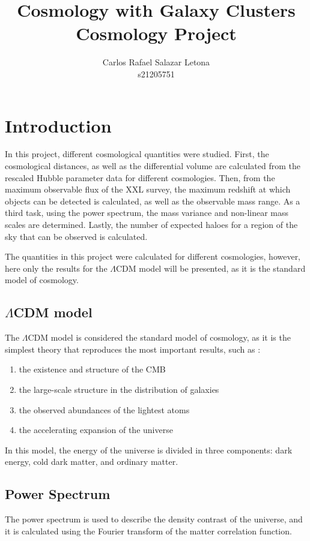 \documentclass[12pt]{article}
\begin{document}
\title{Cosmology with Galaxy Clusters \\ Cosmology Project}
\author{Carlos Rafael Salazar Letona \\ s21205751}
\maketitle

\section{Introduction}
In this project, different cosmological quantities were studied. First, the cosmological distances, as well as the differential volume are calculated from the rescaled Hubble parameter data for different cosmologies. Then, from the maximum observable flux of the XXL survey\cite{ref:xxlsurvey}, the maximum redshift at which objects can be detected is calculated, as well as the observable mass range. As a third task, using the power spectrum, the mass variance and non-linear mass scales are determined. Lastly, the number of expected haloes for a region of the sky that can be observed is calculated.

The quantities in this project were calculated for different cosmologies, however, here only the results for the $\Lambda$CDM model will be presented, as it is the standard model of cosmology.

\subsection{$\Lambda$CDM model}
The $\Lambda$CDM model is considered the standard model of cosmology, as it is the simplest theory that reproduces the most important results, such as \cite{ref:lambdacdm}:

\begin{enumerate}
\item the existence and structure of the CMB
\item the large-scale structure in the distribution of galaxies
\item the observed abundances of the lightest atoms
\item the accelerating expansion of the universe
\end{enumerate}
In this model, the energy of the universe is divided in three components: dark energy, cold dark matter, and ordinary matter.


\subsection{Power Spectrum}
The power spectrum is used to describe the density contrast of the universe, and it is calculated using the Fourier transform of the matter correlation function\cite{ref:powerspectrum}.
\end{document}
